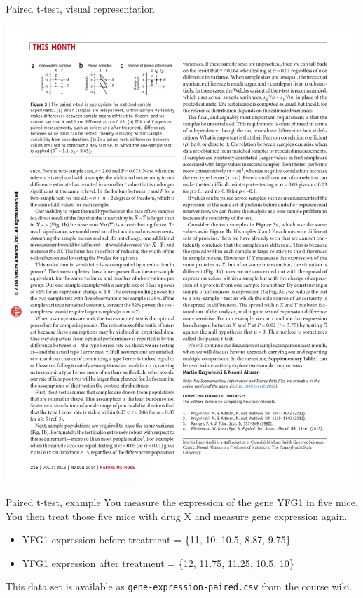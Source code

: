 \documentclass[presentation]{beamer}
\begin{document}
\begin{frame}[label={sec:org8b600c2}]{Paired t-test, visual representation}
\begin{center}
\includegraphics[width=0.98\textwidth]{fig-paired-ttest.pdf}
\end{center}

\end{frame}

\begin{frame}[fragile,label={sec:org1aef768}]{Paired t-test, example}
 You measure the expression of the gene YFG1 in five mice.  You then treat those five mice with drug X and measure gene expression again.

\begin{itemize}
\item YFG1 expression before treatment = \{11, 10, 10.5, 8.87, 9.75\}
\item YFG1 expression after treatment = \{12, 11.75, 11.25, 10.5, 10\}
\end{itemize}

This data set is available as \texttt{gene-expression-paired.csv} from the course wiki.
\end{frame}
\end{document}
